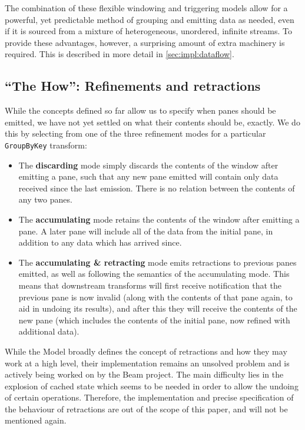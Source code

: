 The combination of these flexible windowing and triggering models allow for a powerful, yet predictable method of grouping and emitting data as needed, even if it is sourced from a mixture of heterogeneous, unordered, infinite streams.
To provide these advantages, however, a surprising amount of extra machinery is required.
This is described in more detail in \cref{sec:impl:dataflow}.

\subsection{``The How'': Refinements and retractions}\label{sec:prep:dataflow:how}

While the concepts defined so far allow us to specify when panes should be emitted, we have not yet settled on what their contents should be, exactly.
We do this by selecting from one of the three refinement modes for a particular \verb|GroupByKey| transform:
\begin{itemize}
	\item The \textbf{discarding} mode simply discards the contents of the window after emitting a pane, such that any new pane emitted will contain only data received since the last emission. There is no relation between the contents of any two panes.
	\item The \textbf{accumulating} mode retains the contents of the window after emitting a pane. A later pane will include all of the data from the initial pane, in addition to any data which has arrived since.
	\item The \textbf{accumulating \& retracting} mode emits retractions to previous panes emitted, as well as following the semantics of the accumulating mode. This means that downstream transforms will first receive notification that the previous pane is now invalid (along with the contents of that pane again, to aid in undoing its results), and after this they will receive the contents of the new pane (which includes the contents of the initial pane, now refined with additional data). 
\end{itemize}


While the Model broadly defines the concept of retractions and how they may work at a high level, their implementation remains an unsolved problem and is actively being worked on by the Beam project.
The main difficulty lies in the explosion of cached state which seems to be needed in order to allow the undoing of certain operations.
Therefore, the implementation and precise specification of the behaviour of retractions are out of the scope of this paper, and will not be mentioned again.

